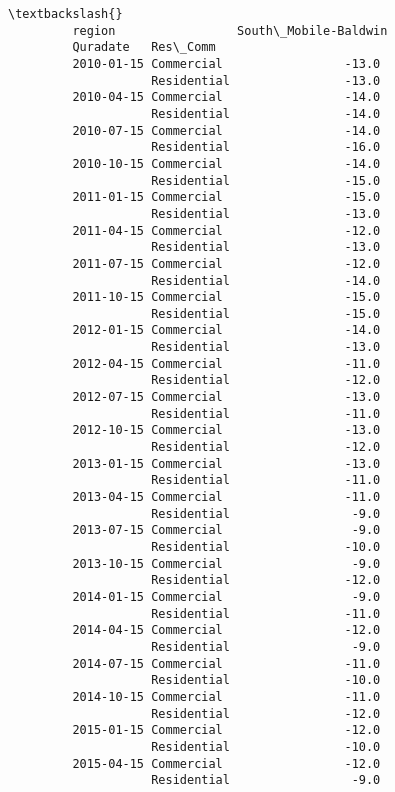 \documentclass[11pt]{article}
\begin{document}
\begin{Verbatim}[commandchars=\\\{\}]
                                                      \textbackslash{}
         region                 South\_Mobile-Baldwin   
         Quradate   Res\_Comm                           
         2010-01-15 Commercial                 -13.0   
                    Residential                -13.0   
         2010-04-15 Commercial                 -14.0   
                    Residential                -14.0   
         2010-07-15 Commercial                 -14.0   
                    Residential                -16.0   
         2010-10-15 Commercial                 -14.0   
                    Residential                -15.0   
         2011-01-15 Commercial                 -15.0   
                    Residential                -13.0   
         2011-04-15 Commercial                 -12.0   
                    Residential                -13.0   
         2011-07-15 Commercial                 -12.0   
                    Residential                -14.0   
         2011-10-15 Commercial                 -15.0   
                    Residential                -15.0   
         2012-01-15 Commercial                 -14.0   
                    Residential                -13.0   
         2012-04-15 Commercial                 -11.0   
                    Residential                -12.0   
         2012-07-15 Commercial                 -13.0   
                    Residential                -11.0   
         2012-10-15 Commercial                 -13.0   
                    Residential                -12.0   
         2013-01-15 Commercial                 -13.0   
                    Residential                -11.0   
         2013-04-15 Commercial                 -11.0   
                    Residential                 -9.0   
         2013-07-15 Commercial                  -9.0   
                    Residential                -10.0   
         2013-10-15 Commercial                  -9.0   
                    Residential                -12.0   
         2014-01-15 Commercial                  -9.0   
                    Residential                -11.0   
         2014-04-15 Commercial                 -12.0   
                    Residential                 -9.0   
         2014-07-15 Commercial                 -11.0   
                    Residential                -10.0   
         2014-10-15 Commercial                 -11.0   
                    Residential                -12.0   
         2015-01-15 Commercial                 -12.0   
                    Residential                -10.0   
         2015-04-15 Commercial                 -12.0   
                    Residential                 -9.0   

\end{Verbatim}
\end{document}
